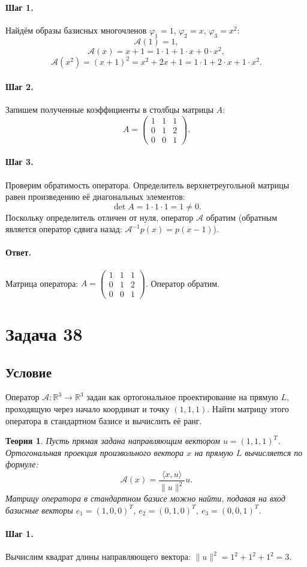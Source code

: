 \documentclass[12pt,a4paper]{article}
\theoremstyle{solution}
\newtheorem*{theory}{Теория}
\newcommand{\task}[1]{\newpage\section*{Задача #1}}
\newcommand{\answer}{\paragraph{Ответ.}}
\newcommand{\step}[1]{\paragraph{Шаг #1.}}
\newcommand{\R}{\mathbb{R}}
\begin{document}
\step{1} Найдём образы базисных многочленов $\varphi_1 = 1$, $\varphi_2 = x$, $\varphi_3 = x^2$:
\[
\mathcal{A}(1) = 1,
\]
\[
\mathcal{A}(x) = x + 1 = 1\cdot 1 + 1\cdot x + 0\cdot x^2,
\]
\[
\mathcal{A}(x^2) = (x + 1)^2 = x^2 + 2x + 1 = 1\cdot 1 + 2\cdot x + 1\cdot x^2.
\]

\step{2} Запишем полученные коэффициенты в столбцы матрицы $A$:
\[
A = \begin{pmatrix} 1 & 1 & 1 \\ 0 & 1 & 2 \\ 0 & 0 & 1 \end{pmatrix}.
\]

\step{3} Проверим обратимость оператора. Определитель верхнетреугольной матрицы равен произведению её диагональных элементов:
\[
\det A = 1 \cdot 1 \cdot 1 = 1 \neq 0.
\]
Поскольку определитель отличен от нуля, оператор $\mathcal{A}$ обратим (обратным является оператор сдвига назад: $\mathcal{A}^{-1}p(x) = p(x-1)$).

\answer
Матрица оператора: $A = \begin{pmatrix} 1 & 1 & 1 \\ 0 & 1 & 2 \\ 0 & 0 & 1 \end{pmatrix}$. Оператор обратим.

\task{38}
\subsection*{Условие}
Оператор $\mathcal{A} : \R^3 \to \R^3$ задан как ортогональное проектирование на прямую $L$, проходящую через начало координат и точку $(1, 1, 1)$. Найти матрицу этого оператора в стандартном базисе и вычислить её ранг.

\begin{theory}
Пусть прямая задана направляющим вектором $u = (1, 1, 1)^T$. Ортогональная проекция произвольного вектора $x$ на прямую $L$ вычисляется по формуле:
\[
\mathcal{A}(x) = \frac{\langle x, u\rangle}{\|u\|^2} u.
\]
Матрицу оператора в стандартном базисе можно найти, подавая на вход базисные векторы $e_1 = (1, 0, 0)^T$, $e_2 = (0, 1, 0)^T$, $e_3 = (0, 0, 1)^T$.
\end{theory}

\step{1} Вычислим квадрат длины направляющего вектора: $\|u\|^2 = 1^2 + 1^2 + 1^2 = 3$.
\end{document}
